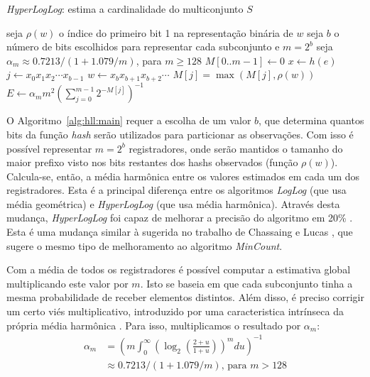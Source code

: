 \begin{algorithm}
\linespread{1}\selectfont
\caption{\emph{HyperLogLog}: estima a cardinalidade do multiconjunto $S$}
\label{alg:hll:main}
\begin{algorithmic}[1]
\State seja $\rho(w)$ o índice do primeiro bit 1 na representação binária de $w$
\State seja $b$ o número de bits escolhidos para representar cada subconjunto e $m=2^b$
\State seja $\alpha_m \approx 0.7213/(1 + 1.079/m)$, para $m \geq 128$
    \State $M[0..m-1] \gets 0$
        \State $x \gets h(e)$
        \State $j \gets x_0x_1x_2 \cdots x_{b-1}$
        \State $w \gets x_b x_{b+1}x_{b+2} \cdots$
        \State $M[j] = \max(M[j], \rho(w))$
    \EndFor
    \State $E \gets \alpha_m m^2 \left(\sum_{j=0}^{m-1} 2^{-M[j]}\right)^{-1}$
	  
	  
    \Else{ }
    \EndIf
\EndFunction
\end{algorithmic}
\end{algorithm}

O Algoritmo~\ref{alg:hll:main} requer a escolha de um valor $b$, que determina quantos bits da função \emph{hash} serão utilizados para particionar as observações. Com isso é possível representar $m=2^b$ registradores, onde serão mantidos o tamanho do maior prefixo visto nos bits restantes dos hashs observados (função $\rho(w)$). Calcula-se, então, a média harmônica entre os valores estimados em cada um dos registradores. Esta é a principal diferença entre os algoritmos \emph{LogLog} (que usa média geométrica) e \emph{HyperLogLog} (que usa média harmônica). Através desta mudança, \emph{HyperLogLog} foi capaz de melhorar a precisão do algoritmo em 20\%  \cite{flajolet2008hyperloglog}. Esta é uma mudança similar à sugerida no trabalho de Chassaing e Lucas \cite{chassaing2007efficient}, que sugere o mesmo tipo de melhoramento ao algoritmo \emph{MinCount}.

Com a média de todos os registradores é possível computar a estimativa global multiplicando este valor por $m$. Isto se baseia em que cada subconjunto tinha a mesma probabilidade de receber elementos distintos. Além disso, é preciso corrigir um certo viés multiplicativo, introduzido por uma caracteristica intrínseca da própria média harmônica \cite{flajolet2008hyperloglog}. Para isso, multiplicamos o resultado por $\alpha_m$:
\begin{align*}
    \alpha_m & = \left( m \int_0^\infty \left( \log_2 \left( \frac{2+u}{1+u} \right) \right)^m du \right) ^ {-1} \\
             & \approx  0.7213/(1+ 1.079/m) \text{, para } m>128
\end{align*}

